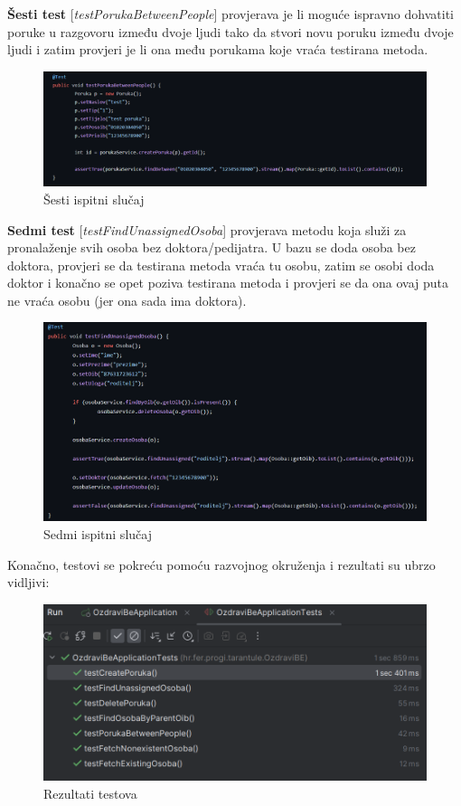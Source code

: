 		 	\noindent \textbf{Šesti test} [\textit{testPorukaBetweenPeople}] provjerava je li moguće ispravno dohvatiti poruke u razgovoru između dvoje ljudi tako da stvori novu poruku između dvoje ljudi i zatim provjeri je li ona među porukama koje vraća testirana metoda. 
		 	\begin{figure}[H]
		 		\includegraphics[width=\textwidth]{slike/junit_6.png}
		 		\caption{Šesti ispitni slučaj}
		 		\label{fig:junit_6}
		 	\end{figure}
		 	
		 	\noindent \textbf{Sedmi test} [\textit{testFindUnassignedOsoba}] provjerava metodu koja služi za pronalaženje svih osoba bez doktora/pedijatra. U bazu se doda osoba bez doktora, provjeri se da testirana metoda vraća tu osobu, zatim se osobi doda doktor i konačno se opet poziva testirana metoda i provjeri se da ona ovaj puta ne vraća osobu (jer ona sada ima doktora). 
		 	\begin{figure}[H]
		 		\includegraphics[width=\textwidth]{slike/junit_7.png}
		 		\caption{Sedmi ispitni slučaj}
		 		\label{fig:junit_7}
		 	\end{figure}
		 	
		 	\noindent Konačno, testovi se pokreću pomoću razvojnog okruženja i rezultati su ubrzo vidljivi:
		 	\begin{figure}[H]
		 		\includegraphics[width=\textwidth]{slike/junit_result.png}
		 		\caption{Rezultati testova}
		 		\label{fig:junit_result}
		 	\end{figure}
			

